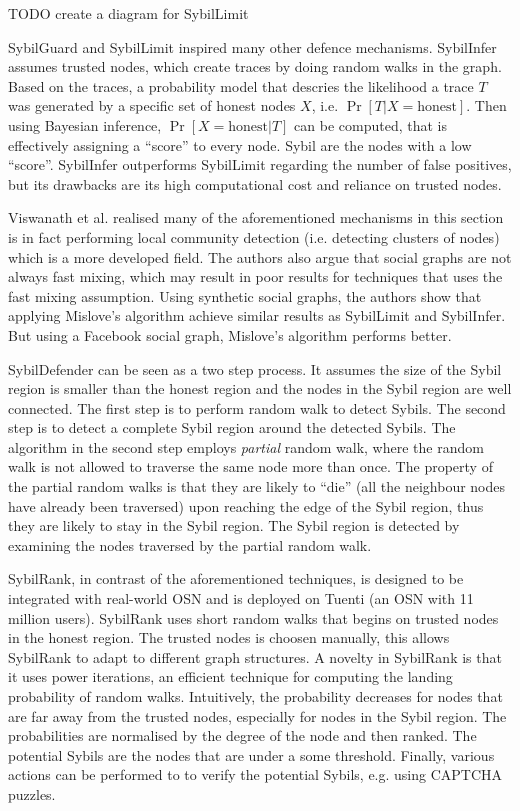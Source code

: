 TODO create a diagram for SybilLimit

SybilGuard and SybilLimit inspired many other defence mechanisms.
SybilInfer\cite{danezis2009sybilinfer} assumes trusted nodes, which create
traces by doing random walks in the graph. Based on the traces, a probability
model that descries the likelihood a trace $T$ was generated by a specific set
of honest nodes $X$, i.e. $\Pr[ T | X = \text{honest}]$. Then using Bayesian
inference, $\Pr[ X = \text{honest}| T ]$ can be computed, that is effectively
assigning a ``score'' to every node. Sybil are the nodes with a low ``score''.
SybilInfer outperforms SybilLimit regarding the number of false positives, but
its drawbacks are its high computational cost and reliance on trusted nodes.

Viswanath et al. realised many of the aforementioned mechanisms in this section
is in fact performing local community detection (i.e. detecting clusters of
nodes) which is a more developed field\cite{viswanath2010analysis}. The authors
also argue that social graphs are not always fast mixing, which may result in
poor results for techniques that uses the fast mixing assumption. Using
synthetic social graphs, the authors show that applying Mislove's
algorithm\cite{mislove2010you} achieve similar results as SybilLimit and
SybilInfer. But using a Facebook social graph, Mislove's algorithm performs
better.

SybilDefender\cite{wei2012sybildefender} can be seen as a two step process. It
assumes the size of the Sybil region is smaller than the honest region and the
nodes in the Sybil region are well connected. The first step is to perform
random walk to detect Sybils. The second step is to detect a complete Sybil
region around the detected Sybils. The algorithm in the second step employs
\emph{partial} random walk, where the random walk is not allowed to traverse the
same node more than once. The property of the partial random walks is that they
are likely to ``die'' (all the neighbour nodes have already been traversed) upon
reaching the edge of the Sybil region, thus they are likely to stay in the Sybil
region. The Sybil region is detected by examining the nodes traversed by the
partial random walk.


SybilRank, in contrast of the aforementioned techniques, is designed to be
integrated with real-world OSN and is deployed on Tuenti (an OSN with 11 million
users)\cite{cao2012aiding}. SybilRank uses short random walks that begins on
trusted nodes in the honest region. The trusted nodes is choosen manually, this
allows SybilRank to adapt to different graph structures. A novelty in SybilRank
is that it uses power iterations, an efficient technique for computing the
landing probability of random walks. Intuitively, the probability decreases for
nodes that are far away from the trusted nodes, especially for nodes in the
Sybil region. The probabilities are normalised by the degree of the node and
then ranked. The potential Sybils are the nodes that are under a some threshold.
Finally, various actions can be performed to to verify the potential Sybils,
e.g. using CAPTCHA puzzles.

